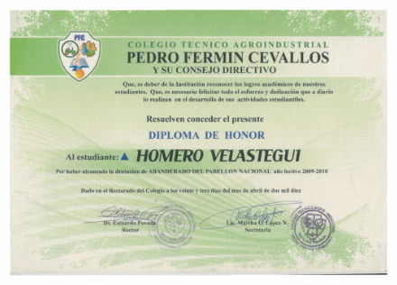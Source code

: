 \begin{figure}[ht]
    \setlength{\parindent}{-25pt}
    \includegraphics[width=\textwidth]{4.-Meritos/Certificados/1.png}
\end{figure}